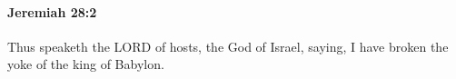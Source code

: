 
		\paragraph{Jeremiah 28:2} %
			\label{JEREMIAH-28-2}

			Thus speaketh the LORD of hosts, the God of Israel, saying, I have broken the yoke of the king of Babylon.


